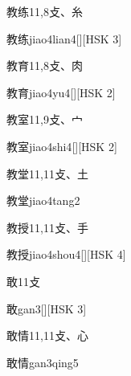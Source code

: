 \begin{entry}{教练}{11,8}{⽁、⽷}
  \begin{phonetics}{教练}{jiao4lian4}[][HSK 3]
  \end{phonetics}
\end{entry}

\begin{entry}{教育}{11,8}{⽁、⾁}
  \begin{phonetics}{教育}{jiao4yu4}[][HSK 2]
  \end{phonetics}
\end{entry}

\begin{entry}{教室}{11,9}{⽁、⼧}
  \begin{phonetics}{教室}{jiao4shi4}[][HSK 2]
  \end{phonetics}
\end{entry}

\begin{entry}{教堂}{11,11}{⽁、⼟}
  \begin{phonetics}{教堂}{jiao4tang2}
  \end{phonetics}
\end{entry}

\begin{entry}{教授}{11,11}{⽁、⼿}
  \begin{phonetics}{教授}{jiao4shou4}[][HSK 4]
  \end{phonetics}
\end{entry}

\begin{entry}{敢}{11}{⽁}
  \begin{phonetics}{敢}{gan3}[][HSK 3]
  \end{phonetics}
\end{entry}

\begin{entry}{敢情}{11,11}{⽁、⼼}
  \begin{phonetics}{敢情}{gan3qing5}
  \end{phonetics}
\end{entry}

